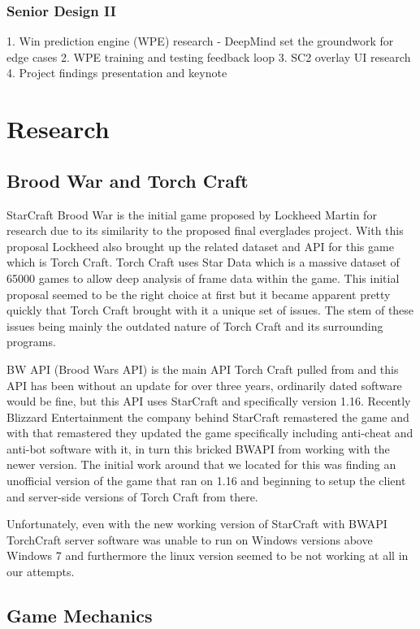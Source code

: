 \documentclass[a4paper,12pt]{report}
\begin{document}
\subsection{Senior Design II}

1. Win prediction engine (WPE) research
- DeepMind set the groundwork for edge cases
2. WPE training and testing feedback loop
3. SC2 overlay UI research
4. Project findings presentation and keynote

\chapter{Research}
\section{Brood War and Torch Craft}

StarCraft Brood War is the initial game proposed by Lockheed Martin for research due to its similarity to the proposed final everglades project. With this proposal Lockheed also brought up the related dataset and API for this game which is Torch Craft. Torch Craft uses Star Data which is a massive dataset of 65000 games to allow deep analysis of frame data within the game. This initial proposal seemed to be the right choice at first but it became apparent pretty quickly that Torch Craft brought with it a unique set of issues. The stem of these issues being mainly the outdated nature of Torch Craft and its surrounding programs.

BW API (Brood Wars API) is the main API Torch Craft pulled from and this API has been without an update for over three years, ordinarily dated software would be fine, but this API uses StarCraft and specifically version 1.16. Recently Blizzard Entertainment the company behind StarCraft remastered the game and with that remastered they updated the game specifically including anti-cheat and anti-bot software with it, in turn this bricked BWAPI from working with the newer version. The initial work around that we located for this was finding an unofficial version of the game that ran on 1.16 and beginning to setup the client and server-side versions of Torch Craft from there. 

Unfortunately, even with the new working version of StarCraft with BWAPI TorchCraft server software was unable to run on Windows versions above Windows 7 and furthermore the linux version seemed to be not working at all in our attempts.

\section{Game Mechanics}
\end{document}
